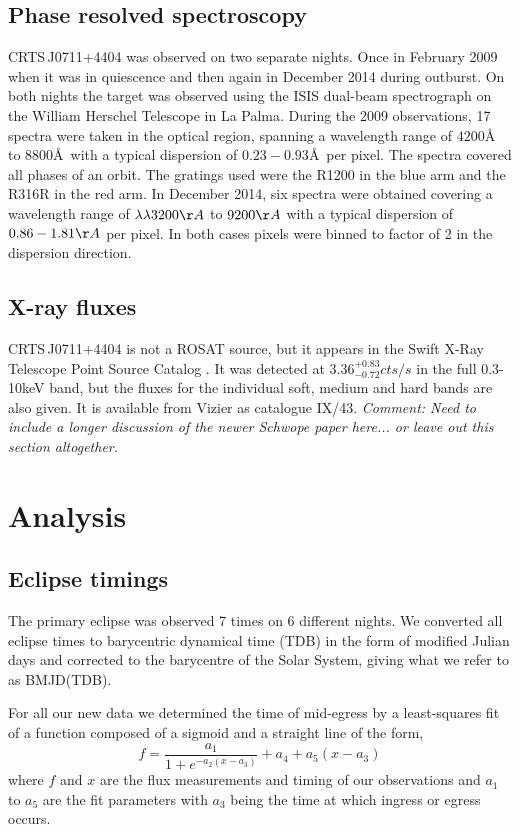 \documentclass[a4paper,fleqn,usenatbib]{mnras}
\begin{document}
\subsection{Phase resolved spectroscopy}
CRTS\,J0711+4404 was observed on two separate nights. Once in February 2009 when it was in quiescence and then again in December 2014 during outburst. On both nights the target was observed using the ISIS dual-beam spectrograph on the William Herschel Telescope in La Palma. During the 2009 observations, 17 spectra were taken in the optical region, spanning a wavelength range of  $4200$\AA\, to $8800$\AA\, with a typical dispersion of $0.23-0.93$\AA\, per pixel. The spectra covered all phases of an orbit. The gratings used were the R1200 in the blue arm and the R316R in the red arm. In December 2014, six spectra were obtained covering a wavelength range of $\lambda\lambda 3200 \AA$ to $9200 \AA$ with a typical dispersion of $0.86 - 1.81 \AA$ per pixel. In both cases pixels were binned to factor of 2 in the dispersion direction. 

\subsection{X-ray fluxes}
CRTS\,J0711+4404 is not a ROSAT source, but it appears in the Swift X-Ray Telescope Point Source Catalog \citep{2014ApJS..210....8E}. It was detected at $3.36 ^{+0.83} _{-0.72} cts/s$ in the full 0.3-10keV band, but the fluxes for the individual soft, medium and hard bands are also given. It is available from Vizier as catalogue IX/43.
\emph{Comment: Need to include a longer discussion of the newer Schwope paper here... or leave out this section altogether.}

\section{Analysis}

\subsection{Eclipse timings}
The primary eclipse was observed 7 times on 6 different nights.  We converted all eclipse times to barycentric dynamical time (TDB) in the form of modified Julian days and corrected to the barycentre of the Solar System, giving what we refer to as BMJD(TDB).

For all our new data we determined the time of mid-egress by a least-squares fit of a function composed of a sigmoid and a straight line of the form, 
\begin{equation}f = \frac{a_1}{1+e^{-a_2(x-a_3)}} + a_4 + a_5(x - a_3)\end{equation}
where $f$ and $x$ are the flux measurements and timing of our observations and $a_1$ to $a_5$ are the fit parameters with $a_3$ being the time at which ingress or egress occurs. 
\end{document}
